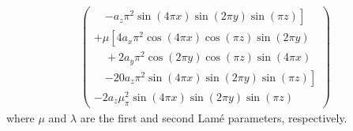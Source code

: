 \documentclass[sn-mathphys,Numbered]{sn-jnl}%
\newcommand{\bb}{\boldsymbol}
\begin{document}
\begin{appendices}
\begin{align}
\begin{pmatrix}
        \quad \left. - a_z \pi^2 \sin(4\pi x) \sin(2\pi y) \sin(\pi z)
    \right] \\
    + \mu
    \left[
        4 a_x \pi^2 \cos(4\pi x) \cos(\pi z) \sin(2\pi y) \right. \\
        \quad + 2 a_y \pi^2 \cos(2\pi y) \cos(\pi z) \sin(4\pi x) \\
        \quad \left. - 20 a_z \pi^2 \sin(4\pi x) \sin(2\pi y) \sin(\pi z)
    \right] \\
    - 2 a_z \mu_ \pi^2 \sin(4\pi x) \sin(2\pi y) \sin(\pi z)
    \end{pmatrix}
\end{align}
where $\mu$ and $\lambda$ are the first and second Lam\'{e} parameters, respectively.



\end{appendices}
\end{document}
